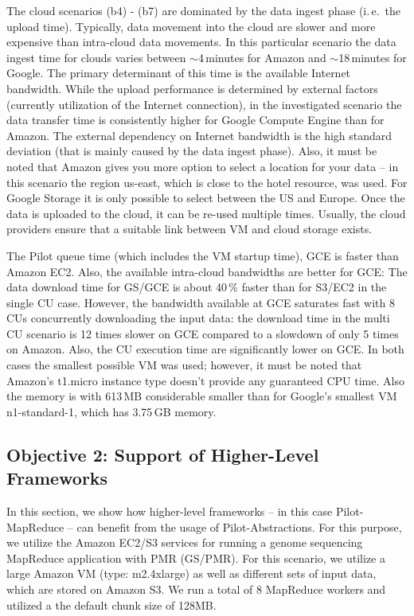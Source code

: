 \documentclass[times]{cpeauth}
\newcommand{\pilot}{Pilot\xspace}
\newcommand{\cu}{CU\xspace}
\newcommand{\cus}{CUs\xspace}
\begin{document}
The cloud scenarios (b4) - (b7) are dominated by the data ingest phase
(i.\,e.\ the upload time). Typically, data movement into the cloud are slower
and more expensive than intra-cloud data movements. In this particular
scenario the data ingest time for clouds varies between $\sim$4\,minutes for
Amazon and $\sim$18\,minutes for Google. The primary determinant of this time
is the available Internet bandwidth. While the upload performance is
determined by external factors (currently utilization of the Internet
connection), in the investigated scenario the data transfer time is
consistently higher for Google Compute Engine than for Amazon. The external
dependency on Internet bandwidth is the high standard deviation (that is
mainly caused by the data ingest phase). Also, it must be noted that Amazon
gives you more option to select a location for your data -- in this scenario
the region us-east, which is close to the hotel resource, was used. For Google
Storage it is only possible to select between the US and Europe. Once the data
is uploaded to the cloud, it can be re-used multiple times. Usually, the cloud 
providers ensure that a suitable link between VM and cloud storage exists.

The \pilot queue time (which includes the VM startup time), GCE is faster than
Amazon EC2. Also, the available intra-cloud bandwidths are better for GCE: The
data download time for GS/GCE is about 40\,\% faster than for S3/EC2 in the
single \cu case. However, the bandwidth available at GCE saturates fast with
8\,\cus concurrently downloading the input data: the download time in the
multi \cu scenario is 12 times slower on GCE compared to a slowdown of only 5
times on Amazon. Also, the \cu execution time are significantly lower on GCE.
In both cases the smallest possible VM was used; however, it must be noted
that Amazon's t1.micro instance type doesn't provide any guaranteed CPU time.
Also the memory is with 613\,MB considerable smaller than for Google's
smallest VM n1-standard-1, which has 3.75\,GB memory.




\subsection{Objective 2: Support of Higher-Level Frameworks}

In this section, we show how higher-level frameworks -- in this case
Pilot-MapReduce -- can benefit from the usage of \pilot-Abstractions. For this
purpose, we utilize the Amazon EC2/S3 services for running a genome sequencing 
MapReduce application with PMR (GS/PMR). For this scenario, we utilize a large 
Amazon VM (type: m2.4xlarge) as well as different sets of input data, which 
are stored on Amazon S3. We run a total of 8 MapReduce workers and utilized a 
the default chunk size of 128MB. 
\end{document}
